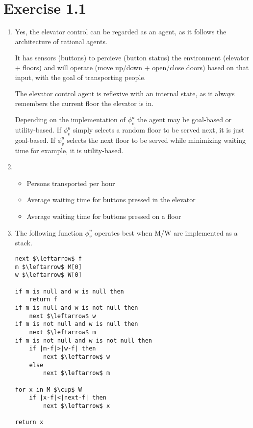 \documentclass{article}
\begin{document}
\section*{Exercise 1.1}
\begin{enumerate}[label=(\alph*)]
	\item	Yes, the elevator control can be regarded as an agent, as it follows the architecture of rational agents.

			It has sensors (buttons) to percieve (button status) the environment (elevator + floors) and will operate (move up/down + open/close doors) based on that input, with the goal of transporting people.

			The elevator control agent is reflexive with an internal state, as it always remembers the current floor the elevator is in.

			Depending on the implementation of $\phi_v^u$ the agent may be goal-based or utility-based. If $\phi_v^u$ simply selects a random floor to be served next, it is just goal-based. If $\phi_v^u$ selects the next floor to be served while minimizing waiting time for example, it is utility-based.
	\item	\begin{itemize}
				\item	Persons transported per hour
				\item	Average waiting time for buttons pressed in the elevator
				\item	Average waiting time for buttons pressed on a floor
			\end{itemize}
	\item	The following function $\phi_v^u$ operates best when M/W are implemented as a stack.
\begin{lstlisting}
next $\leftarrow$ f
m $\leftarrow$ M[0]
w $\leftarrow$ W[0]

if m is null and w is null then
	return f
if m is null and w is not null then
	next $\leftarrow$ w
if m is not null and w is null then
	next $\leftarrow$ m
if m is not null and w is not null then
	if |m-f|>|w-f| then
		next $\leftarrow$ w
	else
		next $\leftarrow$ m

for x in M $\cup$ W
	if |x-f|<|next-f| then
		next $\leftarrow$ x

return x
\end{lstlisting}
\end{enumerate}
\end{document}
